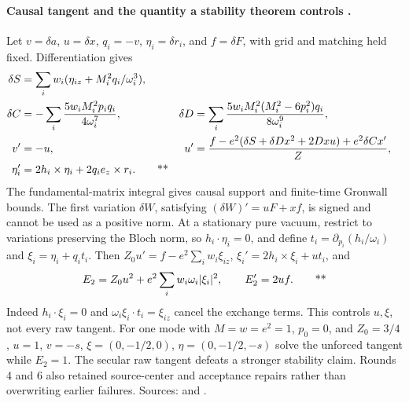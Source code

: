 \paragraph{Causal tangent and the quantity a stability theorem controls \workstar.}
Let \(v=\delta a\), \(u=\delta x\), \(q_i=-v\), \(\eta_i=\delta r_i\),
and \(f=\delta F\), with grid and matching held fixed.  Differentiation gives
\begin{align}
 \delta S&=\sum_iw_i(\eta_{iz}+M_i^2q_i/\omega_i^3),\notag\\
 \delta C&=-\sum_i\frac{5w_iM_i^2p_iq_i}{4\omega_i^7},&
 \delta D&=\sum_i\frac{5w_iM_i^2(M_i^2-6p_i^2)q_i}{8\omega_i^9},\notag\\
 v'&=-u,&
 u'&=\frac{f-e^2(\delta S+\delta D x^2+2Dxu)+e^2\delta Cx'}{Z},\notag\\
 \eta_i'&=2h_i\times\eta_i+2q_i e_z\times r_i.
 \qquad\text{**}\label{early:tangent}
\end{align}
The fundamental-matrix integral gives causal support and finite-time
Gronwall bounds.  The first variation \(\delta W\), satisfying
\((\delta W)'=uF+xf\), is signed and cannot be used as a positive norm.
At a stationary pure vacuum, restrict to variations preserving the Bloch
norm, so \(h_i\cdot\eta_i=0\), and define
\(t_i=\partial_{p_i}(h_i/\omega_i)\) and
\(\xi_i=\eta_i+q_it_i\).  Then
\(Z_0u'=f-e^2\sum_iw_i\xi_{iz}\),
\(\xi_i'=2h_i\times\xi_i+ut_i\), and
\begin{equation}
 E_2=Z_0u^2+e^2\sum_iw_i\omega_i|\xi_i|^2,
 \qquad E_2'=2uf.\qquad\text{**}
 \label{early:secondvariation}
\end{equation}
Indeed \(h_i\cdot\xi_i=0\) and \(\omega_i\xi_i\cdot t_i=\xi_{iz}\)
cancel the exchange terms.  This controls \(u,\xi\), not every raw tangent.
For one mode with \(M=w=e^2=1\), \(p_0=0\), and \(Z_0=3/4\),
\(u=1\), \(v=-s\), \(\xi=(0,-1/2,0)\),
\(\eta=(0,-1/2,-s)\) solve the unforced tangent while \(E_2=1\).
The secular raw tangent defeats a stronger stability claim.  Rounds 4 and 6
also retained source-center and acceptance repairs rather than overwriting
earlier failures.  Sources: 
and .


